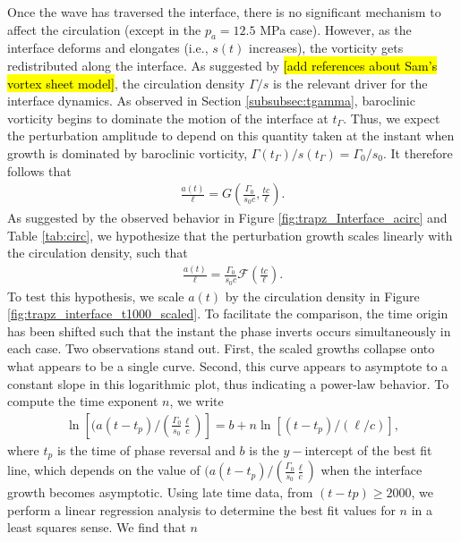 \documentclass{jfm}%
\begin{document}
Once the wave has traversed the interface, there is no significant
mechanism to affect the circulation (except in the $p_a = 12.5$ MPa
case). However, as the interface deforms and elongates (i.e., $s(t)$
increases), the vorticity gets redistributed along the interface. As
suggested by \hl{[add references about Sam's vortex sheet model]}, the
circulation density $\Gamma / s$ is the relevant driver for the
interface dynamics. As observed in Section \ref{subsubsec:tgamma},
baroclinic vorticity begins to dominate the motion of the interface at
$t_\Gamma$. Thus, we expect the perturbation amplitude to depend on
this quantity taken at the instant when growth is dominated by
baroclinic vorticity, $\Gamma(t_\Gamma)/s(t_\Gamma) = \Gamma_0 /
s_0$. It therefore follows that
% 
\begin{align}
  \label{eq:dimensionless_groups}
  \frac{a(t)}{\ell}=G\left(\frac{\Gamma_0}{s_0 c}, \frac{t c}{\ell} \right).
\end{align}
% 
As suggested by the observed behavior in Figure
\ref{fig:trapz_Interface_acirc} and Table \ref{tab:circ}, we hypothesize
that the perturbation growth scales linearly with the circulation
density, such that
% 
\begin{align}
  \label{eq:dimensionless_relationship}
  \frac{a(t)}{\ell}=\frac{\Gamma_0}{s_0 c}\mathcal{F}\left(\frac{t c}{\ell} \right).
\end{align}
% 
To test this hypothesis, we scale $a(t)$ by the circulation density in
Figure \ref{fig:trapz_interface_t1000_scaled}. To facilitate the
comparison, the time origin has been shifted such that the instant the 
phase inverts occurs simultaneously in each case. Two observations
stand out. First, the scaled growths collapse onto what appears to be
a single curve. Second, this curve appears to asymptote to a constant
slope in this logarithmic plot, thus indicating a power-law
behavior. To compute the time exponent $n$, we write
\begin{align}
  \label{eq:log_a}
  \ln\left[(a(t-t_p) / \left(\frac{\Gamma_0}{s_0}\frac{\ell}{c}\right)\right] = b + n\ln\left[(t-t_p)/(\ell/c)\right],
\end{align}
where $t_p$ is the time of phase reversal and $b$ is the $y-$intercept
of the best fit line, which depends on the value of
$(a(t-t_p) / \left(\frac{\Gamma_0}{s_0}\frac{\ell}{c}\right)$ when the
interface growth becomes asymptotic. Using late time data, from
$(t-tp)\geq2000$, we perform a linear regression analysis to determine
the best fit values for $n$ in a least squares sense. We find that $n$
\end{document}
